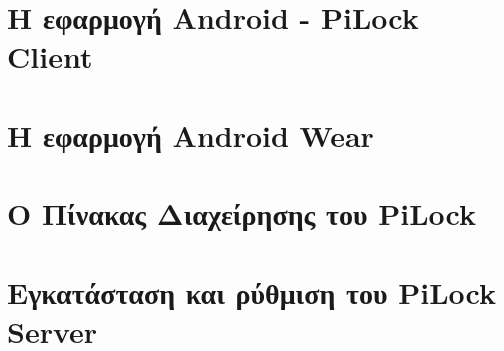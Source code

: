 \documentclass[12pt]{report}
\begin{document}
    \chapter{Η εφαρμογή Android - PiLock Client}
    

    \chapter{Η εφαρμογή Αndroid Wear}
    

    \chapter{Ο Πίνακας Διαχείρησης του PiLock}
    

    \chapter{Εγκατάσταση και ρύθμιση του PiLock Server}
    

    
    
\end{document}
